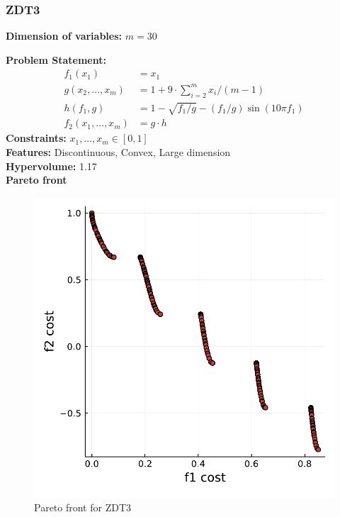 \documentclass[11pt,oneside,onecolumn,openright]{article}
\begin{document}
   \subsubsection{ZDT3~\cite{huband2006review}}
  \textbf{Dimension of variables: }$m=30$

  \noindent\textbf{Problem Statement: }
  \begin{equation}
  \begin{aligned}
  f_{1}\left(x_{1}\right) &=x_{1} \\
  g\left(x_{2}, \ldots, x_{m}\right) &=1+9 \cdot \sum_{i=2}^{m} x_{i} /(m-1) \\
  h\left(f_{1}, g\right) &=1-\sqrt{f_{1} / g}-\left(f_{1} / g\right) \sin \left(10 \pi f_{1}\right)\\
  f_2(x_{1}, \ldots, x_{m})&=g\cdot h
  \end{aligned}
  \end{equation}
  \noindent\textbf{Constraints: } $x_{1}, \ldots, x_{m}\in [0,1]$\\
  \noindent\textbf{Features: } Discontinuous, Convex, Large dimension\\
  \noindent\textbf{Hypervolume: } 1.17\\
  \noindent\textbf{Pareto front}
      \begin{figure}[H]
      \centering
      \includegraphics[width=12cm]{fig/dt1.pdf}
      \cprotect\caption{Pareto front for ZDT3}
      \label{fig:ZDT3}
      \end{figure}
\end{document}

